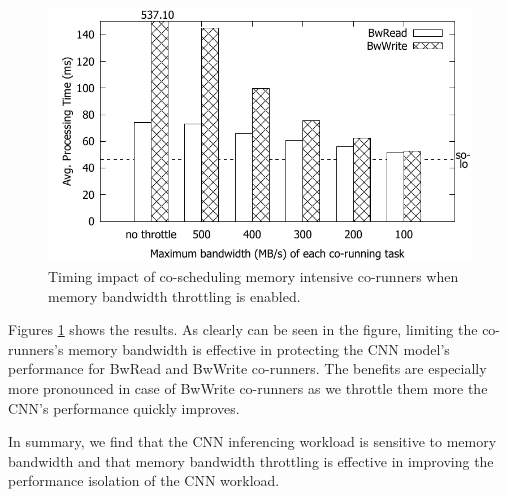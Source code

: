 \begin{figure}[h]
  \centering
  \includegraphics[width=.45\textwidth]{figs/memguard_bandwidth}
  \caption{Timing impact of co-scheduling memory intensive
co-runners when memory bandwidth throttling is enabled. }
  \label{fig:memguard_bandwidth}
\end{figure}

Figures \ref{fig:memguard_bandwidth} shows the results.
As clearly can be seen in the figure, limiting the co-runners's memory
bandwidth is effective in protecting the CNN model's performance for
BwRead and BwWrite co-runners. The benefits are especially more
pronounced in case of BwWrite co-runners as we throttle them more the
CNN's performance quickly improves.


In summary, we find that the CNN inferencing workload is sensitive to
memory bandwidth and that memory bandwidth throttling is effective in
improving the performance isolation of the CNN workload.



